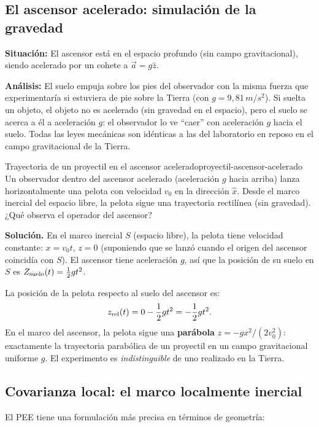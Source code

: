 \subsection{El ascensor acelerado: simulación de la gravedad}

\textbf{Situación:} El ascensor está en el espacio profundo (sin campo gravitacional), siendo acelerado por un cohete a $\vec{a} = g\hat{z}$.

\textbf{Análisis:} El suelo empuja sobre los pies del observador con la misma fuerza que experimentaría si estuviera de pie sobre la Tierra (con $g = 9{,}81\,\si{m/s^2}$). Si suelta un objeto, el objeto no es acelerado (sin gravedad en el espacio), pero el suelo se acerca a él a aceleración $g$: el observador lo ve ``caer'' con aceleración $g$ hacia el suelo. Todas las leyes mecánicas son idénticas a las del laboratorio en reposo en el campo gravitacional de la Tierra.

\begin{ejemplo}{Trayectoria de un proyectil en el ascensor acelerado}{proyectil-ascensor-acelerado}
Un observador dentro del ascensor acelerado (aceleración $g$ hacia arriba) lanza horizontalmente una pelota con velocidad $v_0$ en la dirección $\hat{x}$. Desde el marco inercial del espacio libre, la pelota sigue una trayectoria rectilínea (sin gravedad). ¿Qué observa el operador del ascensor?

\textbf{Solución.} En el marco inercial $S$ (espacio libre), la pelota tiene velocidad constante: $x = v_0 t$, $z = 0$ (suponiendo que se lanzó cuando el origen del ascensor coincidía con $S$). El ascensor tiene aceleración $g$, así que la posición de su suelo en $S$ es $Z_{\rm suelo}(t) = \frac{1}{2}g t^2$.

La posición de la pelota respecto al suelo del ascensor es:
\[
  z_{\rm rel}(t) = 0 - \frac{1}{2}g t^2 = -\frac{1}{2}g t^2.
\]
En el marco del ascensor, la pelota sigue una \textbf{parábola} $z = -g x^2/(2v_0^2)$: exactamente la trayectoria parabólica de un proyectil en un campo gravitacional uniforme $g$. El experimento es \emph{indistinguible} de uno realizado en la Tierra.
\end{ejemplo}

\subsection{Covarianza local: el marco localmente inercial}

El PEE tiene una formulación más precisa en términos de geometría:

